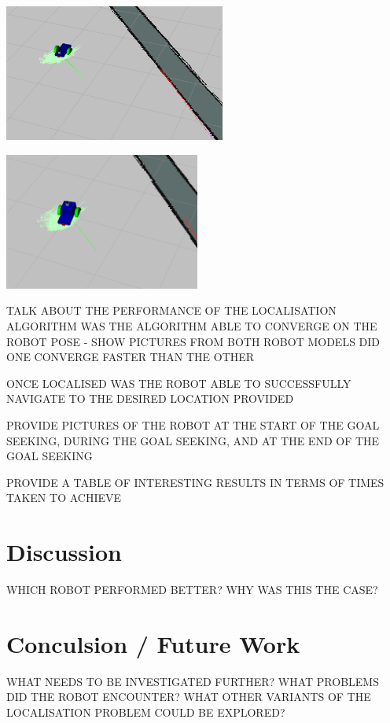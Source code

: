 \documentclass[a4paper]{article}
\begin{document}
\begin{minipage}{0.45\textwidth}
\centering
\includegraphics[height=4.5cm]{og_model_3}
\end{minipage}
\hspace{1cm}
\begin{minipage}{0.45\textwidth}
\centering
\includegraphics[height=4.5cm]{new_model_3}
\end{minipage}

TALK ABOUT THE PERFORMANCE OF THE LOCALISATION ALGORITHM WAS THE ALGORITHM ABLE TO CONVERGE ON THE ROBOT POSE - SHOW PICTURES FROM BOTH ROBOT MODELS DID ONE CONVERGE FASTER THAN THE OTHER

ONCE LOCALISED WAS THE ROBOT ABLE TO SUCCESSFULLY NAVIGATE TO THE DESIRED LOCATION PROVIDED

PROVIDE PICTURES OF THE ROBOT AT THE START OF THE GOAL SEEKING, DURING THE GOAL SEEKING, AND AT THE END OF THE GOAL SEEKING

PROVIDE A TABLE OF INTERESTING RESULTS IN TERMS OF TIMES TAKEN TO ACHIEVE

\section{Discussion}
WHICH ROBOT PERFORMED BETTER? WHY WAS THIS THE CASE?

\section{Conculsion / Future Work}
WHAT NEEDS TO BE INVESTIGATED FURTHER? WHAT PROBLEMS DID THE ROBOT ENCOUNTER? WHAT OTHER VARIANTS OF THE LOCALISATION PROBLEM COULD BE EXPLORED? 

\newpage



\end{document}

